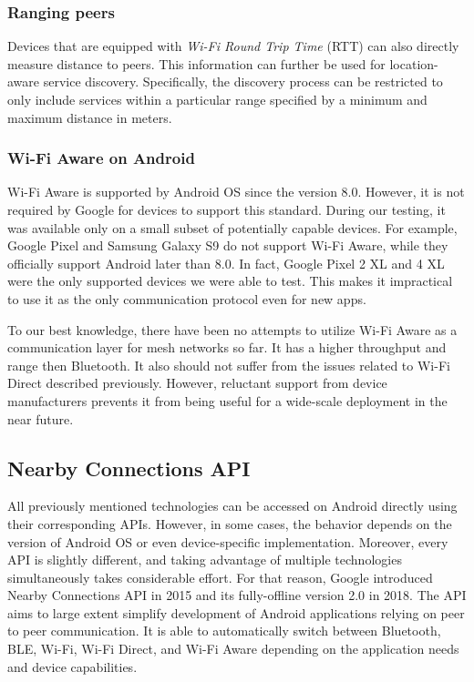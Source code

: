 \documentclass[conference,compsoc]{IEEEtran}
\begin{document}
\subsubsection{Ranging peers}

Devices that are equipped with \textit{Wi-Fi Round Trip Time} (RTT) can also directly measure distance to peers. This information can further be used for location-aware service discovery. Specifically, the discovery process can be restricted to only include services within a particular range specified by a minimum and maximum distance in meters.

\subsubsection{Wi-Fi Aware on Android}

Wi-Fi Aware is supported by Android OS since the version 8.0. However, it is not required by Google for devices to support this standard. During our testing, it was available only on a small subset of potentially capable devices. For example, Google Pixel and Samsung Galaxy S9 do not support Wi-Fi Aware, while they officially support Android later than 8.0. In fact, Google Pixel 2 XL and 4 XL were the only supported devices we were able to test. This makes it impractical to use it as the only communication protocol even for new apps.

To our best knowledge, there have been no attempts to utilize Wi-Fi Aware as a communication layer for mesh networks so far. It has a higher throughput and range then Bluetooth. It also should not suffer from the issues related to Wi-Fi Direct described previously. However, reluctant support from device manufacturers prevents it from being useful for a wide-scale deployment in the near future.

\subsection{Nearby Connections API}

All previously mentioned technologies can be accessed on Android directly using their corresponding APIs. However, in some cases, the behavior depends on the version of Android OS or even device-specific implementation. Moreover, every API is slightly different, and taking advantage of multiple technologies simultaneously takes considerable effort. For that reason, Google introduced Nearby Connections API in 2015 and its fully-offline version 2.0 in 2018. \cite{nearby2} The API aims to large extent simplify development of Android applications relying on peer to peer communication. It is able to automatically switch between Bluetooth, BLE, Wi-Fi, Wi-Fi Direct, and Wi-Fi Aware depending on the application needs and device capabilities.
\end{document}
